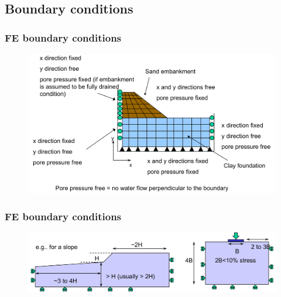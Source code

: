 \documentclass[handout]{beamer}
\begin{document}
\subsection{Boundary conditions}
\begin{frame}
\frametitle{FE boundary conditions}
\begin{figure}[ht]
	\centering
	\includegraphics[width=\textwidth]{figs/boundary-conditions.png}
\end{figure}
\end{frame}

\begin{frame}
\frametitle{FE boundary conditions}
\begin{figure}[ht]
	\centering
	\includegraphics[width=\textwidth]{figs/fe-boundaries.png}
\end{figure}
\end{frame}
\end{document}
